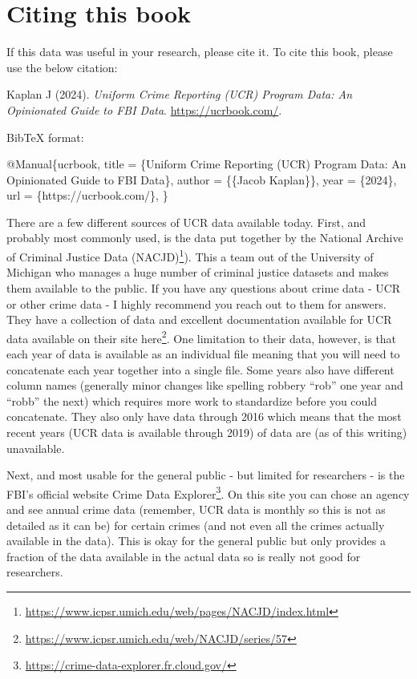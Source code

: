 \documentclass[
]{krantz}
\makeatletter
\newenvironment{Shaded}{\begin{snugshade}}{\end{snugshade}}
\newcommand{\DataTypeTok}[1]{\textcolor[rgb]{0.27,0.27,0.27}{#1}}
\newcommand{\NormalTok}[1]{#1}
\newcommand{\OtherTok}[1]{\textcolor[rgb]{0.37,0.37,0.37}{#1}}
\newcommand{\VariableTok}[1]{\textcolor[rgb]{0,0,0}{#1}}
\renewcommand{\href}[2]{#2\footnote{\url{#1}}}
\newenvironment{kframe}{%
\medskip{}
\setlength{\fboxsep}{.8em}
 \def\at@end@of@kframe{}%
 \ifinner\ifhmode%
  \def\at@end@of@kframe{\end{minipage}}%
  \begin{minipage}{\columnwidth}%
 \fi\fi%
 \def\FrameCommand##1{\hskip\@totalleftmargin \hskip-\fboxsep
 \colorbox{shadecolor}{##1}\hskip-\fboxsep
     \hskip-\linewidth \hskip-\@totalleftmargin \hskip\columnwidth}%
 \MakeFramed {\advance\hsize-\width
   \@totalleftmargin\z@ \linewidth\hsize
   \@setminipage}}%
 {\par\unskip\endMakeFramed%
 \at@end@of@kframe}
\renewenvironment{Shaded}{\begin{kframe}}{\end{kframe}}
\makeatother
\begin{document}
\section{Citing this book}\label{citing-this-book}

If this data was useful in your research, please cite it. To
cite this book, please use the below citation:

Kaplan J (2024). \emph{Uniform Crime Reporting (UCR) Program
Data: An Opinionated Guide to FBI Data}.
\url{https://ucrbook.com/}.

BibTeX format:

\begin{Shaded}
\begin{Highlighting}[]
\VariableTok{@Manual}\NormalTok{\{}\OtherTok{ucrbook}\NormalTok{,}
  \DataTypeTok{title}\NormalTok{ = \{Uniform Crime Reporting (UCR) Program Data: An Opinionated Guide to FBI Data\},}
  \DataTypeTok{author}\NormalTok{ = \{\{Jacob Kaplan\}\},}
  \DataTypeTok{year}\NormalTok{ = \{2024\},}
  \DataTypeTok{url}\NormalTok{ = \{https://ucrbook.com/\},}
\NormalTok{\}}
\end{Highlighting}
\end{Shaded}

There are a few different sources of UCR data available
today. First, and probably most commonly used, is the data
put together by the
\href{https://www.icpsr.umich.edu/web/pages/NACJD/index.html}{National
Archive of Criminal Justice Data (NACJD)}). This a team out
of the University of Michigan who manages a huge number of
criminal justice datasets and makes them available to the
public. If you have any questions about crime data - UCR or
other crime data - I highly recommend you reach out to them
for answers. They have a collection of data and excellent
documentation available for UCR data available on their site
\href{https://www.icpsr.umich.edu/web/NACJD/series/57}{here}.
One limitation to their data, however, is that each year of
data is available as an individual file meaning that you
will need to concatenate each year together into a single
file. Some years also have different column names (generally
minor changes like spelling robbery ``rob'' one year and
``robb'' the next) which requires more work to standardize
before you could concatenate. They also only have data
through 2016 which means that the most recent years (UCR
data is available through 2019) of data are (as of this
writing) unavailable.

Next, and most usable for the general public - but limited
for researchers - is the FBI's official website
\href{https://crime-data-explorer.fr.cloud.gov/}{Crime Data
Explorer}. On this site you can chose an agency and see
annual crime data (remember, UCR data is monthly so this is
not as detailed as it can be) for certain crimes (and not
even all the crimes actually available in the data). This is
okay for the general public but only provides a fraction of
the data available in the actual data so is really not good
for researchers.
\end{document}
